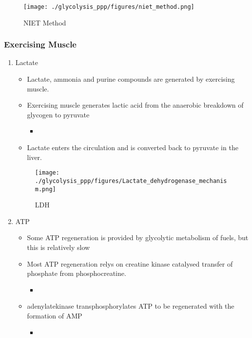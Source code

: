 \documentclass{scrartcl}
\begin{document}
\begin{figure}[htbp]
\centering
\texttt{[image: ./glycolysis\_ppp/figures/niet\_method.png]}
\caption{\label{fig:orgc03d113}
NIET Method}
\end{figure}

\subsubsection{Exercising Muscle}
\label{sec:org36904f7}
\begin{enumerate}
\item Lactate
\label{sec:org6b51fbc}
\begin{itemize}
\item Lactate, ammonia and purine compounds are generated by exercising muscle.
\item Exercising muscle generates lactic acid from the anaerobic breakdown
of glycogen to pyruvate
\begin{itemize}
\item {}
\end{itemize}
\item Lactate enters the circulation and is converted back to pyruvate in the liver.
\end{itemize}

\begin{figure}[htbp]
\centering
\texttt{[image: ./glycolysis\_ppp/figures/Lactate\_dehydrogenase\_mechanism.png]}
\caption{\label{fig:org093a0b7}
LDH}
\end{figure}

\item ATP
\label{sec:org6dbbc61}

\begin{itemize}
\item Some ATP regeneration is provided by glycolytic metabolism of fuels,
but this is relatively slow
\item Most ATP regeneration relys on creatine kinase catalysed transfer of
phosphate from phosphocreatine.

\begin{itemize}
\item {}
\end{itemize}

\item adenylatekinase transphosphorylates ATP to be regenerated with the formation
of AMP

\begin{itemize}
\item {}
\end{itemize}


\end{itemize}
\end{enumerate}
\end{document}

